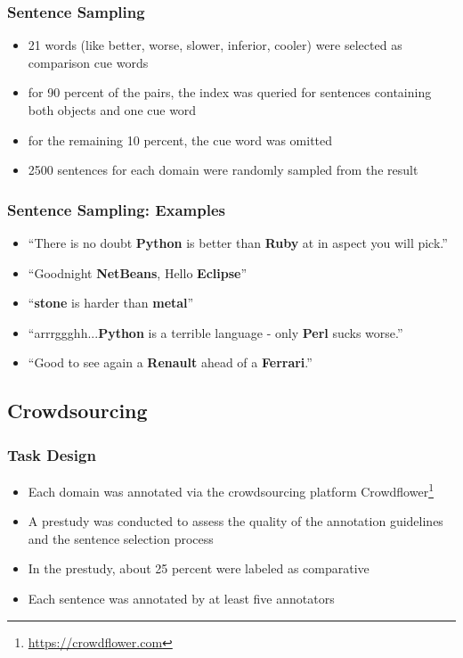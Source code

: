 \documentclass[11pt,aspectratio=169]{beamer}
\begin{document}
    \begin{frame}
        \frametitle{Sentence Sampling}

        \begin{itemize}
            \item 21 words (like better, worse, slower, inferior, cooler) were selected as comparison cue words
            \item for 90 percent of the pairs, the index was queried for sentences containing both objects and one cue word
            \item for the remaining 10 percent, the cue word was omitted
            \item 2500 sentences for each domain were randomly sampled from the result
        \end{itemize}

    \end{frame}

    \begin{frame}
        \frametitle{Sentence Sampling: Examples}
        \begin{itemize}
            \item \enquote{There is no doubt \textbf{Python} is better than \textbf{Ruby} at in aspect you will pick.}
            \item \enquote{Goodnight \textbf{NetBeans}, Hello \textbf{Eclipse}}
            \item \enquote{\textbf{stone} is harder than \textbf{metal}}
            \item \enquote{arrrggghh...\textbf{Python} is a terrible language - only \textbf{Perl} sucks worse.}
            \item \enquote{Good to see again a \textbf{Renault} ahead of a \textbf{Ferrari}.}
        \end{itemize}
    \end{frame}

    \subsection{Crowdsourcing}
    \frame{\subsectionpage}
    \begin{frame}
        \frametitle{Task Design}
        \begin{itemize}
            \item Each domain was annotated via the crowdsourcing platform Crowdflower\footnote{\url{https://crowdflower.com}}
            \item A prestudy was conducted to assess the quality of the annotation guidelines and the sentence selection process
            \item In the prestudy, about 25 percent were labeled as comparative
            \item Each sentence was annotated by at least five annotators
        \end{itemize}

    \end{frame}
\end{document}
